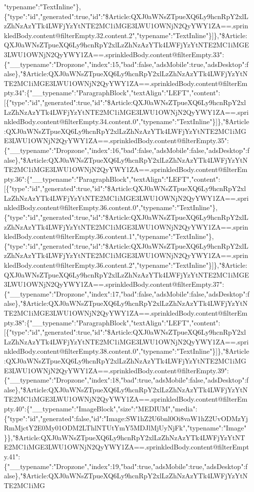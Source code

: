 "typename":"TextInline"\},\{"type":"id","generated":true,"id":"\$Article:QXJ0aWNsZTpueXQ6Ly9hcnRpY2xlLzZhNzAzYTk4LWFjYzYtNTE2MC1iMGE3LWU1OWNjN2QyYWY1ZA==.sprinkledBody.content@filterEmpty.32.content.2","typename":"TextInline"\}{]}\},"\$Article:QXJ0aWNsZTpueXQ6Ly9hcnRpY2xlLzZhNzAzYTk4LWFjYzYtNTE2MC1iMGE3LWU1OWNjN2QyYWY1ZA==.sprinkledBody.content@filterEmpty.33":\{"\_\_typename":"Dropzone","index":15,"bad":false,"adsMobile":true,"adsDesktop":false\},"\$Article:QXJ0aWNsZTpueXQ6Ly9hcnRpY2xlLzZhNzAzYTk4LWFjYzYtNTE2MC1iMGE3LWU1OWNjN2QyYWY1ZA==.sprinkledBody.content@filterEmpty.34":\{"\_\_typename":"ParagraphBlock","textAlign":"LEFT","content":{[}\{"type":"id","generated":true,"id":"\$Article:QXJ0aWNsZTpueXQ6Ly9hcnRpY2xlLzZhNzAzYTk4LWFjYzYtNTE2MC1iMGE3LWU1OWNjN2QyYWY1ZA==.sprinkledBody.content@filterEmpty.34.content.0","typename":"TextInline"\}{]}\},"\$Article:QXJ0aWNsZTpueXQ6Ly9hcnRpY2xlLzZhNzAzYTk4LWFjYzYtNTE2MC1iMGE3LWU1OWNjN2QyYWY1ZA==.sprinkledBody.content@filterEmpty.35":\{"\_\_typename":"Dropzone","index":16,"bad":false,"adsMobile":false,"adsDesktop":false\},"\$Article:QXJ0aWNsZTpueXQ6Ly9hcnRpY2xlLzZhNzAzYTk4LWFjYzYtNTE2MC1iMGE3LWU1OWNjN2QyYWY1ZA==.sprinkledBody.content@filterEmpty.36":\{"\_\_typename":"ParagraphBlock","textAlign":"LEFT","content":{[}\{"type":"id","generated":true,"id":"\$Article:QXJ0aWNsZTpueXQ6Ly9hcnRpY2xlLzZhNzAzYTk4LWFjYzYtNTE2MC1iMGE3LWU1OWNjN2QyYWY1ZA==.sprinkledBody.content@filterEmpty.36.content.0","typename":"TextInline"\},\{"type":"id","generated":true,"id":"\$Article:QXJ0aWNsZTpueXQ6Ly9hcnRpY2xlLzZhNzAzYTk4LWFjYzYtNTE2MC1iMGE3LWU1OWNjN2QyYWY1ZA==.sprinkledBody.content@filterEmpty.36.content.1","typename":"TextInline"\},\{"type":"id","generated":true,"id":"\$Article:QXJ0aWNsZTpueXQ6Ly9hcnRpY2xlLzZhNzAzYTk4LWFjYzYtNTE2MC1iMGE3LWU1OWNjN2QyYWY1ZA==.sprinkledBody.content@filterEmpty.36.content.2","typename":"TextInline"\}{]}\},"\$Article:QXJ0aWNsZTpueXQ6Ly9hcnRpY2xlLzZhNzAzYTk4LWFjYzYtNTE2MC1iMGE3LWU1OWNjN2QyYWY1ZA==.sprinkledBody.content@filterEmpty.37":\{"\_\_typename":"Dropzone","index":17,"bad":false,"adsMobile":false,"adsDesktop":false\},"\$Article:QXJ0aWNsZTpueXQ6Ly9hcnRpY2xlLzZhNzAzYTk4LWFjYzYtNTE2MC1iMGE3LWU1OWNjN2QyYWY1ZA==.sprinkledBody.content@filterEmpty.38":\{"\_\_typename":"ParagraphBlock","textAlign":"LEFT","content":{[}\{"type":"id","generated":true,"id":"\$Article:QXJ0aWNsZTpueXQ6Ly9hcnRpY2xlLzZhNzAzYTk4LWFjYzYtNTE2MC1iMGE3LWU1OWNjN2QyYWY1ZA==.sprinkledBody.content@filterEmpty.38.content.0","typename":"TextInline"\}{]}\},"\$Article:QXJ0aWNsZTpueXQ6Ly9hcnRpY2xlLzZhNzAzYTk4LWFjYzYtNTE2MC1iMGE3LWU1OWNjN2QyYWY1ZA==.sprinkledBody.content@filterEmpty.39":\{"\_\_typename":"Dropzone","index":18,"bad":true,"adsMobile":false,"adsDesktop":false\},"\$Article:QXJ0aWNsZTpueXQ6Ly9hcnRpY2xlLzZhNzAzYTk4LWFjYzYtNTE2MC1iMGE3LWU1OWNjN2QyYWY1ZA==.sprinkledBody.content@filterEmpty.40":\{"\_\_typename":"ImageBlock","size":"MEDIUM","media":\{"type":"id","generated":false,"id":"Image:SW1hZ2U6bnl0Oi8vaW1hZ2UvODMzYjRmMjctY2E0My01ODM2LThlNTUtYmY5MDJlMjUyNjFk","typename":"Image"\}\},"\$Article:QXJ0aWNsZTpueXQ6Ly9hcnRpY2xlLzZhNzAzYTk4LWFjYzYtNTE2MC1iMGE3LWU1OWNjN2QyYWY1ZA==.sprinkledBody.content@filterEmpty.41":\{"\_\_typename":"Dropzone","index":19,"bad":true,"adsMobile":true,"adsDesktop":false\},"\$Article:QXJ0aWNsZTpueXQ6Ly9hcnRpY2xlLzZhNzAzYTk4LWFjYzYtNTE2MC1iMG
